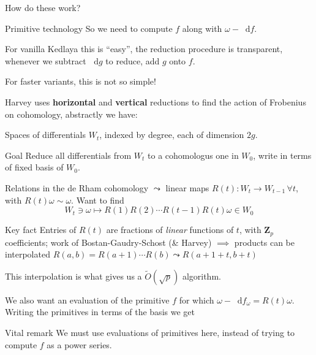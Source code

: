 \documentclass[notheorems]{beamer}
\theoremstyle{plain}
\theoremstyle{definition}
\theoremstyle{definition}
\theoremstyle{definition}
\newcommand{\term}[1]{\textbf{#1}}
\newcommand{\diff}{\mathop{}\!\mathrm{d}}
\newcommand{\ZZ}{\mathbf{Z}}
\begin{document}
\begin{frame}{How do these work?}
    
\end{frame}


\begin{frame}{Primitive technology}
    So we need to compute \(f\) along with \(\omega - \diff f\).

    For vanilla Kedlaya this is ``easy'', the reduction procedure is transparent, whenever we subtract \(\diff g\) to reduce, add \(g\) onto \(f\).

    For faster variants, this is not so simple!
\end{frame}

\begin{frame}
    Harvey uses \term{horizontal} and \term{vertical} reductions to find the action of Frobenius on cohomology, \pause%
    abstractly we have:

    Spaces of differentials \(W_t\), indexed by degree, each of dimension \(2g\).
    \begin{block}{Goal} Reduce all differentials from \(W_t\) to a cohomologus one in \(W_0\), write in terms of fixed basis of \(W_0\).\end{block}
    \pause%
    Relations in the de Rham cohomology \(\leadsto\) linear maps \(R(t)\colon W_t \to W_{t-1}\,\forall t\), with \(R(t) \omega \sim \omega\).
    \pause%
    Want to find
    \[W_t \ni \omega \mapsto R(1) R(2) \cdots R(t-1)R(t) \omega \in W_0\]

    \pause%
    \begin{alertblock}{Key fact}
        Entries of \(R(t)\) are fractions of \emph{linear} functions of \(t\), with \(\ZZ_p\) coefficients; work of Bostan-Gaudry-Schost (\& Harvey) $\implies$ products can be interpolated
        \(R(a,b) = R(a+1) \cdots R(b)\leadsto R(a+1+t,b+t)\)
    \end{alertblock}

\end{frame}

\begin{frame}
    This interpolation is what gives us a \(\widetilde O(\sqrt p)\) algorithm.

    We also want an evaluation of the primitive \(f\) for which \(\omega - \diff f_{\omega} = R(t)\omega\).
    Writing the primitives in terms of the basis we get 

    \pause%
    \begin{block}{Vital remark}
        We must use evaluations of primitives here, instead of trying to compute \(f\) as a power series.
    \end{block}

\end{frame}
\end{document}
